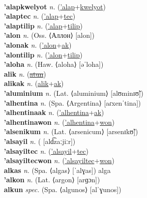  \label{'alaplawt} \\
\textbf{'alapkwelyot} \textit{n.} (\hyperref['alap]{'alap}+\hyperref[kwelyot]{kwelyot})
 \label{'alapkwelyot} \\
\textbf{'alaptec} \textit{n.} (\hyperref['alap]{'alap}+\hyperref[tec]{tec})
 \label{'alaptec} \\
\textbf{'alaptilip} \textit{n.} (\hyperref['alap]{'alap}+\hyperref[tilip]{tilip})
 \label{'alaptilip} \\
\textbf{'alon} \textit{n.} (Oss. ⟨Аллон⟩ [alon])
 \label{'alon} \\
\textbf{'alonak} \textit{n.} (\hyperref['alon]{'alon}+\hyperref[ak]{ak})
 \label{'alonak} \\
\textbf{'alontilip} \textit{n.} (\hyperref['alon]{'alon}+\hyperref[tilip]{tilip})
 \label{'alontilip} \\
\textbf{'aloha} \textit{n.} (Haw. ⟨aloha⟩ [əˈloha])
 \label{'aloha} \\
\textbf{alik} \textit{n.} (\hyperref[atun]{\sout{atun}})
 \label{alik} \\
\textbf{alikak} \textit{n.} (\hyperref[alik]{alik}+\hyperref[ak]{ak})
 \label{alikak} \\
\textbf{'aluminium} \textit{n.} (Lat. ⟨aluminium⟩ [alʊminɪʊ̃])
 \label{'aluminium} \\
\textbf{'alhentina} \textit{n.} (Spa. ⟨Argentina⟩ [aɾxenˈtina])
 \label{'alhentina} \\
\textbf{'alhentinaak} \textit{n.} (\hyperref['alhentina]{'alhentina}+\hyperref[ak]{ak})
 \label{'alhentinaak} \\
\textbf{'alhentinawon} \textit{n.} (\hyperref['alhentina]{'alhentina}+\hyperref[won]{won})
 \label{'alhentinawon} \\
\textbf{'alsenikum} \textit{n.} (Lat. ⟨arsenicum⟩ [arsenɪkʊ̃])
 \label{'alsenikum} \\
\textbf{'alsayil} \textit{n.} ( [ald͡zaːjiːr])
 \label{'alsayil} \\
\textbf{'alsayiltec} \textit{n.} (\hyperref['alsayil]{'alsayil}+\hyperref[tec]{tec})
 \label{'alsayiltec} \\
\textbf{'alsayiltecwon} \textit{n.} (\hyperref['alsayiltec]{'alsayiltec}+\hyperref[won]{won})
 \label{'alsayiltecwon} \\
\textbf{alkas} \textit{n.} (Spa. ⟨algas⟩ [ˈalɣas])
alga \label{alkas} \\
\textbf{'alkon} \textit{n.} (Lat. ⟨argon⟩ [arɡɔn])
 \label{'alkon} \\
\textbf{alkun} \textit{spec.} (Spa. ⟨algunos⟩ [alˈɣunos])
